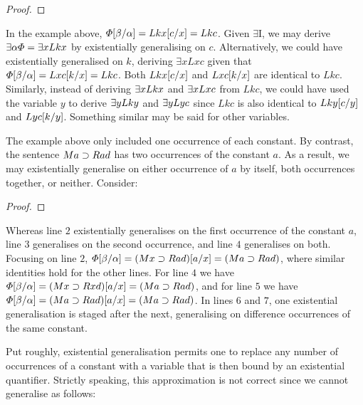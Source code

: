 \begin{proof}
     
	   
\end{proof}

In the example above, $\varPhi[\beta/\alpha]=Lkx[c/x]=Lkc$.
Given $\exists$I, we may derive $\exists \alpha\varPhi=\exists xLkx$ by existentially generalising on $c$.
Alternatively, we could have existentially generalised on $k$, deriving $\exists xLxc$ given that $\varPhi[\beta/\alpha]=Lxc[k/x]=Lkc$. 
Both $Lkx[c/x]$ and $Lxc[k/x]$ are identical to $Lkc$. 
Similarly, instead of deriving $\exists xLkx$ and $\exists xLxc$ from $Lkc$, we could have used the variable $y$ to derive $\exists yLky$ and $\exists yLyc$ since $Lkc$ is also identical to $Lky[c/y]$ and $Lyc[k/y]$.
Something similar may be said for other variables.

The example above only included one occurrence of each constant.
By contrast, the sentence $Ma \supset Rad$ has two occurrences of the constant $a$.
As a result, we may existentially generalise on either occurrence of $a$ by itself, both occurrences together, or neither.
Consider:

\begin{proof}
	 \pr{}
	 
	 
	 
	 
	 
	 
\end{proof}

Whereas line $2$ existentially generalises on the first occurrence of the constant $a$, line $3$ generalises on the second occurrence, and line $4$ generalises on both. 
Focusing on line $2$, $\varPhi[\beta/\alpha]=(Mx \supset Rad)[a/x]=(Ma \supset Rad)$, where similar identities hold for the other lines.
For line $4$ we have $\varPhi[\beta/\alpha]=(Mx \supset Rxd)[a/x]=(Ma \supset Rad)$, and for line $5$ we have $\varPhi[\beta/\alpha]=(Ma \supset Rad)[a/x]=(Ma \supset Rad)$.
In lines $6$ and $7$, one existential generalisation is staged after the next, generalising on difference occurrences of the same constant. 

Put roughly, existential generalisation permits one to replace any number of occurrences of a constant with a variable that is then bound by an existential quantifier.
Strictly speaking, this approximation is not correct since we cannot generalise as follows:

